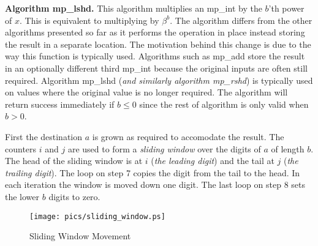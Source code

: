 \documentclass[b5paper]{book}
\begin{document}
\textbf{Algorithm mp\_lshd.}
This algorithm multiplies an mp\_int by the $b$'th power of $x$.  This is equivalent to multiplying by $\beta^b$.  The algorithm differs 
from the other algorithms presented so far as it performs the operation in place instead storing the result in a separate location.  The
motivation behind this change is due to the way this function is typically used.  Algorithms such as mp\_add store the result in an optionally
different third mp\_int because the original inputs are often still required.  Algorithm mp\_lshd (\textit{and similarly algorithm mp\_rshd}) is
typically used on values where the original value is no longer required.  The algorithm will return success immediately if 
$b \le 0$ since the rest of algorithm is only valid when $b > 0$.  

First the destination $a$ is grown as required to accomodate the result.  The counters $i$ and $j$ are used to form a \textit{sliding window} over
the digits of $a$ of length $b$.  The head of the sliding window is at $i$ (\textit{the leading digit}) and the tail at $j$ (\textit{the trailing digit}).  
The loop on step 7 copies the digit from the tail to the head.  In each iteration the window is moved down one digit.   The last loop on 
step 8 sets the lower $b$ digits to zero.

\newpage
\begin{center}
\begin{figure}[here]
\texttt{[image: pics/sliding\_window.ps]}
\caption{Sliding Window Movement}
\label{pic:sliding_window}
\end{figure}
\end{center}
\end{document}
